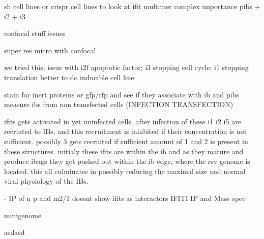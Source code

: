 sh cell lines or crispr cell lines to look at ifit multimer complex importance
pibs + i2 + i3

confocal stuff issues

super res micro with confocal

we tried this; issue with i2f apoptotic factor; i3 stopping cell cycle; i1 stopping translation
better to do inducible cell line

stain for inert proteins or gfp/rfp and see if they associate with ib and pibs
measure ibs from non transfected cells (INFECTION TRANSFECTION)

ifits gets activated in yet uninfected cells. after infection of these i1 i2 i5 are recriuted to IBs, and this recruitment is inhibited if their concentration is not sufficient. possibly 3 gets recruited if sufficient amount of 1 and 2 is present in these structures. initialy these ifits are within the ib and as they mature and produce ibags they get pushed out within the ib edge, where the rsv genome is located. this all culminates in possibly reducing the maximal size and normal viral physiology of the IBs.

\cite{Oliveira2013HumanCells} - IP of n p and m2/1 doesnt show ifits as interactors
IFITI IP and Mass spec

minigenome \cite{Teng2016UseTranscription}


asdasd





